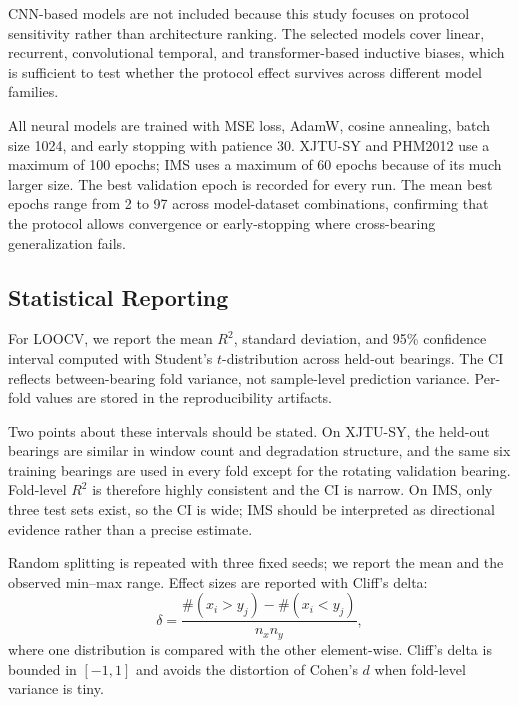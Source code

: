 \documentclass[pdflatex,sn-mathphys-num]{sn-jnl}
\begin{document}
CNN-based models are not included because this study focuses on protocol sensitivity rather than architecture ranking. The selected models cover linear, recurrent, convolutional temporal, and transformer-based inductive biases, which is sufficient to test whether the protocol effect survives across different model families.

All neural models are trained with MSE loss, AdamW, cosine annealing, batch size 1024, and early stopping with patience 30. XJTU-SY and PHM2012 use a maximum of 100 epochs; IMS uses a maximum of 60 epochs because of its much larger size. The best validation epoch is recorded for every run. The mean best epochs range from 2 to 97 across model-dataset combinations, confirming that the protocol allows convergence or early-stopping where cross-bearing generalization fails.

\subsection{Statistical Reporting}
For LOOCV, we report the mean $R^2$, standard deviation, and 95\% confidence interval computed with Student's $t$-distribution across held-out bearings. The CI reflects between-bearing fold variance, not sample-level prediction variance. Per-fold values are stored in the reproducibility artifacts.

Two points about these intervals should be stated. On XJTU-SY, the held-out bearings are similar in window count and degradation structure, and the same six training bearings are used in every fold except for the rotating validation bearing. Fold-level $R^2$ is therefore highly consistent and the CI is narrow. On IMS, only three test sets exist, so the CI is wide; IMS should be interpreted as directional evidence rather than a precise estimate.

Random splitting is repeated with three fixed seeds; we report the mean and the observed min--max range. Effect sizes are reported with Cliff's delta:
\begin{equation}
\delta = \frac{\#(x_i > y_j) - \#(x_i < y_j)}{n_x n_y},
\label{eq:cliff}
\end{equation}
where one distribution is compared with the other element-wise. Cliff's delta is bounded in $[-1, 1]$ and avoids the distortion of Cohen's $d$ when fold-level variance is tiny.
\end{document}
